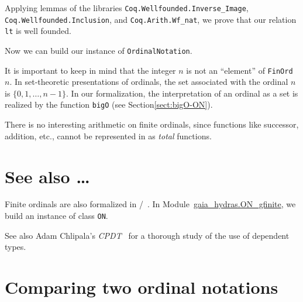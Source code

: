 Applying lemmas of the libraries \texttt{Coq.Wellfounded.Inverse\_Image}, \linebreak
 \texttt{Coq.Wellfounded.Inclusion}, and \texttt{Coq.Arith.Wf\_nat}, we prove that our
relation \texttt{lt} is well founded.




Now we can build our instance of \texttt{OrdinalNotation}.



\begin{remark}
It is important to keep in mind  that the integer $n$ is not an ``element'' of \texttt{FinOrd $n$}. In set-theoretic presentations of ordinals, the set associated with the ordinal $n$ is $\{0,1,\dots,n-1\}$. 
In our formalization, the interpretation of an ordinal as a set is realized by the function \texttt{bigO} (see Section\vref{sect:bigO-ON}).
\end{remark}


\begin{remark}
 There is no interesting arithmetic on finite ordinals, since functions like successor, addition, etc.,  cannot be represented in \coq{} as \emph{total} functions.
\end{remark}

\section{See also \dots}

Finite ordinals are also formalized in \ssreflect/\mathcomp~\cite{MCB}. In Module~\href{../theories/html/gaia_hydras.ON_gfinite.html}{gaia\_hydras.ON\_gfinite}, we build an instance of class \texttt{ON}.







  See also Adam Chlipala's \emph{CPDT}~\cite{chlipalacpdt2011} for a thorough study of the use of dependent types.  





\section{Comparing two ordinal notations}

